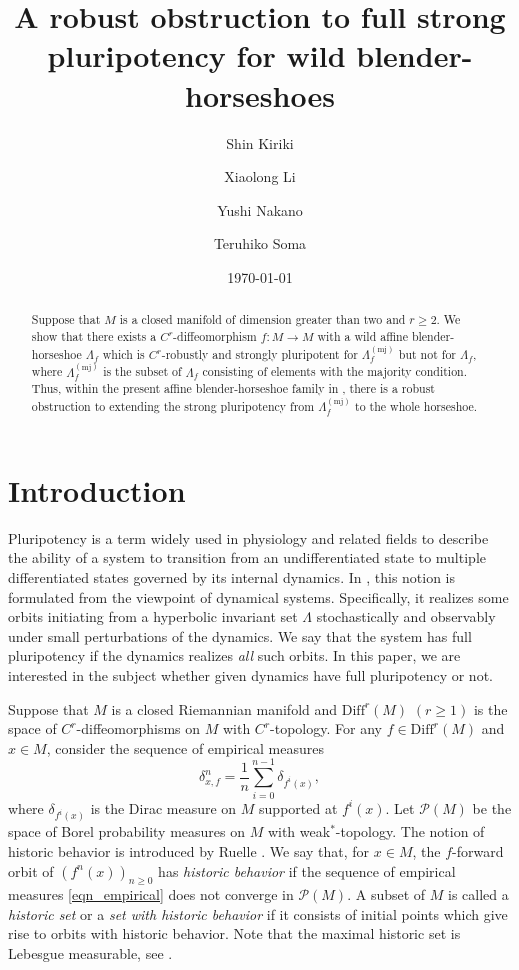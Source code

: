\documentclass{amsart}
\title[A robust obstruction to full strong pluripotency]{A robust obstruction to full strong pluripotency for wild blender-horseshoes}
\date{\today}
\author{Shin Kiriki}
\author{Xiaolong Li}
\author{Yushi Nakano}
\author{Teruhiko Soma}
\theoremstyle{plain}
\theoremstyle{definition}
\theoremstyle{remark}
\numberwithin{equation}{section}
\begin{document}
\begin{abstract}
Suppose that $M$ is a closed manifold of dimension greater than two and $r\geq 2$.
We show that there exists a $C^r$-diffeomorphism $f:M\longrightarrow M$ with a wild affine blender-horseshoe $\Lambda_f$ which is 
$C^r$-robustly and strongly pluripotent for $\Lambda_f^{(\mathrm{mj})}$ but not for $\Lambda_f$, where $\Lambda_f^{(\mathrm{mj})}$ is the subset of $\Lambda_f$ consisting of  elements with the majority condition.
Thus, within the present affine blender-horseshoe family in \cite{KNS}, there is a robust obstruction to extending the strong pluripotency from $\Lambda_f^{(\mathrm{mj})}$ to the whole horseshoe.
\end{abstract}


\maketitle



\section{Introduction}
Pluripotency is a term widely used in physiology and related fields to describe the ability of a system to transition from an undifferentiated state to multiple differentiated states governed by its internal dynamics.
In \cite{KNS}, this notion is formulated from the viewpoint of dynamical systems.
Specifically, it realizes some orbits initiating from a hyperbolic invariant set $\Lambda$ 
stochastically and observably under small perturbations of the dynamics.
We say that the system has full pluripotency if the dynamics realizes \emph{all} such orbits.
In this paper, we are interested in the subject whether given dynamics have full pluripotency or not.

Suppose that $M$ is a closed Riemannian manifold and $\mathrm{Diff}^r(M)$ $(r\geq 1)$ is the space of 
$C^r$-diffeomorphisms on $M$ with $C^r$-topology.
For any $f\in \mathrm{Diff}^r(M)$ and $x\in M$, consider the sequence of empirical  measures 
\begin{equation}\label{eqn_empirical}
\delta^{n}_{x,f}=
\frac{1}{n}\sum_{i=0}^{n-1}\delta_{f^i(x)},
\end{equation}
where $\delta_{f^i(x)}$ is the Dirac measure on $M$ supported at $f^i(x)$.
Let $\mathcal{P}(M)$ be the space of Borel probability measures on $M$ with weak$^*$-topology.
The notion of historic behavior is  introduced by Ruelle \cite{R01}.
We say that, for  $x\in M$, the $f$-forward orbit of $(f^n(x))_{n\geq 0}$ has 
\emph{historic behavior} if the sequence of empirical measures \eqref{eqn_empirical} does not converge in $\mathcal{P}(M)$.
A subset of $M$ is called a \emph{historic set} or a \emph{set with historic behavior} if it consists of initial points which give rise to orbits with historic behavior.
Note that the maximal historic set is Lebesgue measurable, see \cite[Proposition A.1]{KLNS22}.
\end{document}
